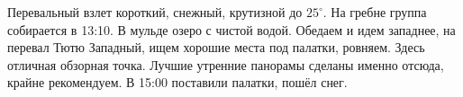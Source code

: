 Перевальный взлет короткий, снежный, крутизной до $25^\circ$. На гребне группа собирается в 13:10. В мульде озеро с чистой водой. Обедаем и идем западнее, на перевал Тютю Западный, ищем хорошие места под палатки, ровняем. Здесь отличная обзорная точка. Лучшие утренние панорамы сделаны именно отсюда, крайне рекомендуем. В 15:00 поставили палатки, пошёл снег.

















    \FloatBarrier
